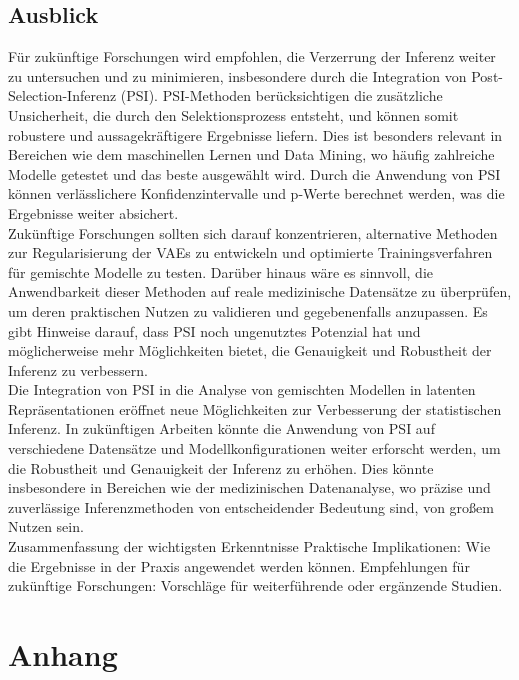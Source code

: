 \documentclass[%
thesis=student,%
coverpage=false,%
titlepage=false,%
headmarks=true, %
german,%
font=libertine, %
math=newpxtx, %
BCOR=5mm,%
coverBCOR=11mm%
]{tumbook}
\theoremstyle{break}
\begin{document}
\section{Ausblick}
Für zukünftige Forschungen wird empfohlen, die Verzerrung der Inferenz weiter zu untersuchen und zu minimieren, insbesondere durch die Integration von Post-Selection-Inferenz (PSI). PSI-Methoden berücksichtigen die zusätzliche Unsicherheit, die durch den Selektionsprozess entsteht, und können somit robustere und aussagekräftigere Ergebnisse liefern. Dies ist besonders relevant in Bereichen wie dem maschinellen Lernen und Data Mining, wo häufig zahlreiche Modelle getestet und das beste ausgewählt wird. Durch die Anwendung von PSI können verlässlichere Konfidenzintervalle und p-Werte berechnet werden, was die Ergebnisse weiter absichert.
\\
Zukünftige Forschungen sollten sich darauf konzentrieren, alternative Methoden zur Regularisierung der VAEs zu entwickeln und optimierte Trainingsverfahren für gemischte Modelle zu testen. Darüber hinaus wäre es sinnvoll, die Anwendbarkeit dieser Methoden auf reale medizinische Datensätze zu überprüfen, um deren praktischen Nutzen zu validieren und gegebenenfalls anzupassen. Es gibt Hinweise darauf, dass PSI noch ungenutztes Potenzial hat und möglicherweise mehr Möglichkeiten bietet, die Genauigkeit und Robustheit der Inferenz zu verbessern.
\\
Die Integration von PSI in die Analyse von gemischten Modellen in latenten Repräsentationen eröffnet neue Möglichkeiten zur Verbesserung der statistischen Inferenz. In zukünftigen Arbeiten könnte die Anwendung von PSI auf verschiedene Datensätze und Modellkonfigurationen weiter erforscht werden, um die Robustheit und Genauigkeit der Inferenz zu erhöhen. Dies könnte insbesondere in Bereichen wie der medizinischen Datenanalyse, wo präzise und zuverlässige Inferenzmethoden von entscheidender Bedeutung sind, von großem Nutzen sein.
\\
Zusammenfassung der wichtigsten Erkenntnisse
Praktische Implikationen: Wie die Ergebnisse in der Praxis angewendet werden können.
Empfehlungen für zukünftige Forschungen: Vorschläge für weiterführende oder ergänzende Studien.
\chapter{Anhang}
\end{document}
